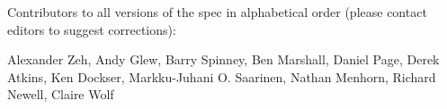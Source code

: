 
%
%

\noindent
Contributors to all versions of the spec in
alphabetical order (please contact editors to suggest
corrections):

Alexander Zeh,
Andy Glew,
Barry Spinney,
Ben Marshall,
Daniel Page,
Derek Atkins,
Ken Dockser,
Markku-Juhani O. Saarinen,
Nathan Menhorn,
Richard Newell,
Claire Wolf
